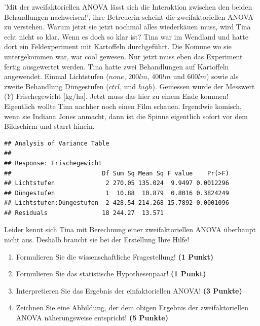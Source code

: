 \documentclass[a4paper, 9pt]{scrartcl}\usepackage[]{graphicx}\usepackage[]{xcolor}
\makeatletter
\newenvironment{kframe}{%
 \def\at@end@of@kframe{}%
 \ifinner\ifhmode%
  \def\at@end@of@kframe{\end{minipage}}%
  \begin{minipage}{\columnwidth}%
 \fi\fi%
 \def\FrameCommand##1{\hskip\@totalleftmargin \hskip-\fboxsep
 \colorbox{shadecolor}{##1}\hskip-\fboxsep
     \hskip-\linewidth \hskip-\@totalleftmargin \hskip\columnwidth}%
 \MakeFramed {\advance\hsize-\width
   \@totalleftmargin\z@ \linewidth\hsize
   \@setminipage}}%
 {\par\unskip\endMakeFramed%
 \at@end@of@kframe}
\newenvironment{knitrout}{}{} %
\makeatother
\begin{document}
'Mit der zweifaktoriellen ANOVA lässt sich die Interaktion zwischen den beiden Behandlungen nachweisen!', ihre Betreuerin scheint die zweifaktoriellen ANOVA zu verstehen. Warum jetzt sie jetzt nochmal alles wiederkäuen muss, wird Tina echt nicht so klar. Wenn es doch so klar ist? Tina war im Wendland und hatte dort ein Feldexperiment mit Kartoffeln durchgeführt. Die Komune wo sie untergekommen war, war cool gewesen. Nur jetzt muss eben das Experiment fertig ausgewertet werden. Tina hatte zwei Behandlungen auf Kartoffeln angewendet. Einmal Lichtstufen ($none$, $200lm$, $400lm$ und $600lm$) sowie als zweite Behandlung Düngestufen ($ctrl$, und $high$). Gemessen wurde der Messwert ($Y$) Frischegewicht [kg/ha]. Jetzt muss das hier zu einem Ende kommen! Eigentlich wollte Tina nachher noch einen Film schauen. Irgendwie komisch, wenn sie Indiana Jones anmacht, dann ist die Spinne eigentlich sofort vor dem Bildschirm und starrt hinein.

\begin{knitrout}
\color{fgcolor}\begin{kframe}
\begin{verbatim}
## Analysis of Variance Table
## 
## Response: Frischegewicht
##                         Df Sum Sq Mean Sq F value    Pr(>F)
## Lichtstufen              2 270.05 135.024  9.9497 0.0012296
## Düngestufen              1  10.88  10.879  0.8016 0.3824249
## Lichtstufen:Düngestufen  2 428.54 214.268 15.7892 0.0001096
## Residuals               18 244.27  13.571
\end{verbatim}
\end{kframe}
\end{knitrout}

\vspace{1ex}

Leider kennt sich Tina mit Berechnung einer zweifaktoriellen ANOVA überhaupt nicht aus. Deshalb braucht sie bei der Erstellung Ihre Hilfe! 

\begin{enumerate}
  \item Formulieren Sie die wissenschaftliche Fragestellung! \textbf{(1 Punkt)}
  \item Formulieren Sie das statistische Hypothesenpaar! \textbf{(1 Punkt)}
\item Interpretieren Sie das Ergebnis der einfaktoriellen ANOVA! \textbf{(3 Punkte)} 
\item Zeichnen Sie eine Abbildung, der dem obigen Ergebnis der
  zweifaktoriellen ANOVA näherungsweise entspricht! \textbf{(5 Punkte)}
\end{enumerate}
 
\end{document}
